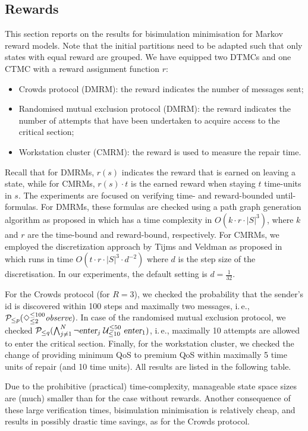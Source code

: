 \documentclass{llncs}
\begin{document}
\subsection{Rewards}
This section reports on the results for bisimulation minimisation for Markov reward models.
Note that the initial partitions need to be adapted such that only states with
equal reward are grouped. 
We have equipped two DTMCs and one CTMC with a reward assignment function $r$:
%
\begin{itemize}
\item Crowds protocol (DMRM): the reward indicates the number of messages sent;
\item Randomised mutual exclusion protocol (DMRM): the reward indicates the number of attempts 
  that have been undertaken to acquire access to the critical section;
\item Workstation cluster (CMRM): the reward is used to measure the repair time. 
\end{itemize}
%
Recall that for DMRMs, $r(s)$ indicates the reward that is earned on leaving a state, while for CMRMs, 
$r(s){\cdot}t$ is the earned reward when staying $t$ time-units in $s$.
The experiments are focused on verifying time- and reward-bounded until-formulas.
For DMRMs, these formulas are checked using a path graph generation algorithm as proposed
in \cite{AndovaHK_FORMATS03} which has a time complexity in $O(k{\cdot}r{\cdot}|S|^3)$, where $k$ and 
$r$ are the time-bound and reward-bound, respectively.
For CMRMs, we employed the discretization approach by Tijms and Veldman as proposed in 
\cite{HaverkortCHKB_DSN02} which runs in time $O(t{\cdot}r{\cdot}|S|^3{\cdot}d^{{-}2})$ where
$d$ is the step size of the discretisation.
In our experiments, the default setting is $d = \frac{1}{32}$.

For the Crowds protocol (for $R=3$), we checked the probability that the sender's id is discovered
within 100 steps and maximally two messages, i.\,e., $\mathcal{P}_{\leq p}(\Diamond^{\leq 100}_{\leq 2}
\mbox{\it observe})$.
In case of the randomised mutual exclusion protocol, we checked ${\cal P}_{\leq q}(\bigwedge_{j \neq 1}^N
\neg \mbox{\sl enter}_j \mathrel{\mathcal{U}}^{\leq 50}_{\leq 10} \mbox{\sl  enter}_1)$, i.\,e., maximally 10 attempts
are allowed to enter the critical section.
Finally, for the workstation cluster, we checked the change of providing minimum QoS to premium
QoS within maximally 5 time units of repair (and 10 time units).
All results are listed in the following table.

Due to the prohibitive (practical) time-complexity, manageable state space sizes are (much) smaller than
for the case without rewards.
Another consequence of these large verification times, bisimulation minimisation is relatively cheap,
and results in possibly drastic time savings, as for the Crowds protocol. 
  
\end{document}
